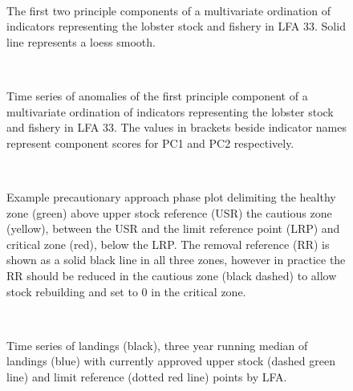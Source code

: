 \documentclass[11pt]{article}
\newcommand{\D}{.}
\newcommand{\e}{/backup/bio_data/bio.lobster/figures/} %
\begin{document}

\begin{figure}
\centering
   \\
                     \caption{The first two principle components of a multivariate ordination of indicators representing the lobster stock and fishery in LFA 33. Solid line represents a loess smooth.}
\end{figure}
\clearpage

\begin{figure}

   \\
                     \caption{Time series of anomalies of the first principle component of a multivariate ordination of indicators representing the lobster stock and fishery in LFA 33. The values in brackets beside indicator names represent component scores for PC1 and PC2 respectively.}
\end{figure}


\begin{figure}

   \\
                     \caption{Example precautionary approach phase plot delimiting the healthy zone (green) above upper stock reference (USR) the cautious zone (yellow), between the USR and the limit reference point (LRP) and critical zone (red), below the LRP. The removal reference (RR) is shown as a solid black line in all three zones, however in practice the RR should be reduced in the cautious zone (black dashed) to allow stock rebuilding and set to 0 in the critical zone.}
\end{figure}




\begin{figure}
        \centering
         \\
                    \caption{Time series of landings (black), three year running median of landings (blue) with currently approved upper stock (dashed green line) and limit reference (dotted red line) points by LFA.}
        \end{figure}
\end{document}
